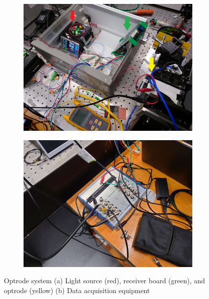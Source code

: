 \begin{figure}
\centering
\begin{subfigure}{.5\textwidth}
  \centering
  \includegraphics[width=0.9\linewidth]{4-ANC_Sys/OptrodeSys.jpg}
  \caption{}
  \label{fig_OptrodeSysPartial}
\end{subfigure}%
\begin{subfigure}{.5\textwidth}
  \centering
  \includegraphics[width=0.9\linewidth]{4-ANC_Sys/DAQ.jpg}
  \caption{}
  \label{fig_DAQ}
\end{subfigure}
\caption{Optrode system (a) Light source (red), receiver board (green), and optrode (yellow) (b) Data acquisition equipment}
\label{fig_OptrodeSys}
\end{figure}

